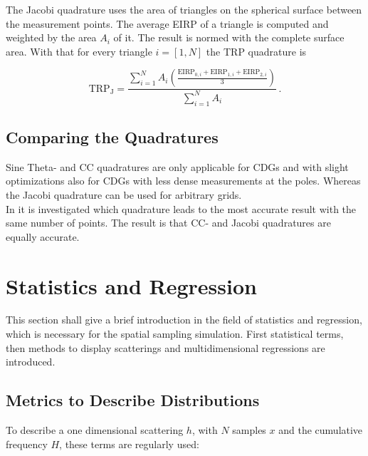 The Jacobi quadrature uses the area of triangles on the spherical surface between the measurement points. The average \ac{EIRP} of a triangle is computed and weighted by the area $A_i$ of it. The result is normed with the complete surface area. With that for every triangle $i=\left[1,N\right]$ the \ac{TRP} quadrature is \cite{trp}

\begin{equation}
\text{TRP}_{\text{J}} = \frac{\sum^N_{i=1}A_i\left(\frac{\text{EIRP}_{0,i}+\text{EIRP}_{1,i}+\text{EIRP}_{2,i}}{3}\right)}{\sum^N_{i=1}A_i}\,.
\end{equation}

\subsection{Comparing the Quadratures}

Sine Theta- and \ac{CC} quadratures are only applicable for \acp{CDG} and with slight optimizations also for \acp{CDG} with less dense measurements at the poles. Whereas the Jacobi quadrature can be used for arbitrary grids.\\
In \cite{trp2} it is investigated which quadrature leads to the most accurate result with the same number of points. The result is that \ac{CC}- and Jacobi quadratures are equally accurate.

\section{Statistics and Regression}

This section shall give a brief introduction in the field of statistics and regression, which is necessary for the spatial sampling simulation. First statistical terms, then methods to display scatterings and multidimensional regressions are introduced.

\subsection{Metrics to Describe Distributions}

To describe a one dimensional scattering $h$, with $N$ samples $x$ and the cumulative frequency $H$, these terms are regularly used: \cite{dffs}

